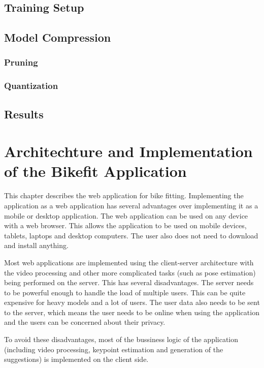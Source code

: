 \section{Training Setup}
\section{Model Compression}

\subsection{Pruning}

\subsection{Quantization}
\section{Results}


\chapter{Architechture and Implementation of the Bikefit Application}

This chapter describes the web application for bike fitting. Implementing the application as a web application has several advantages over implementing it as a mobile or desktop application. The web application can be used on any device with a web browser. This allows the application to be used on mobile devices, tablets, laptops and desktop computers. The user also does not need to download and install anything.

Most web applications are implemented using the client-server architecture with the video processing and other more complicated tasks (such as pose estimation) being performed on the server. This has several disadvantages. The server needs to be powerful enough to handle the load of multiple users. This can be quite expensive for heavy models and a lot of users. The user data also needs to be sent to the server, which means the user needs to be online when using the application and the users can be concerned about their privacy.

To avoid these disadvantages, most of the bussiness logic of the application (including video processing, keypoint estimation and generation of the suggestions) is implemented on the client side.

